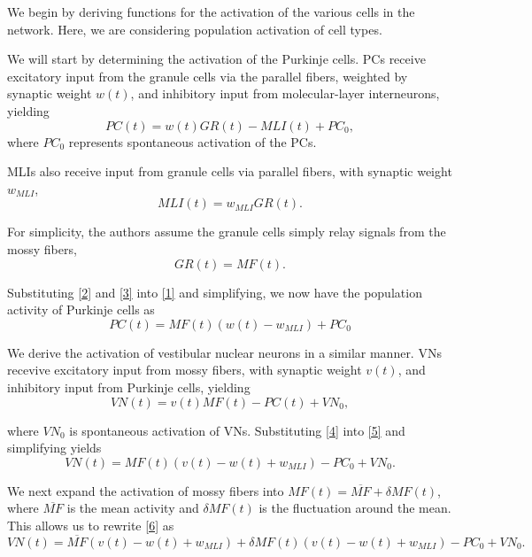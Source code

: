 \documentclass[10pt]{article}
\begin{document}
We begin by deriving functions for the activation of the various cells in the network. Here, we are considering population activation of cell types.

We will start by determining the activation of the Purkinje cells. PCs receive excitatory input from the granule cells via the parallel fibers, weighted by synaptic weight $w(t)$, and  inhibitory input from molecular-layer interneurons, yielding 
\begin{equation}
    \label{1}
    PC(t) = w(t)GR(t)-MLI(t)+PC_0,
\end{equation}
where $PC_0$ represents spontaneous activation of the PCs.

MLIs also receive input from granule cells via parallel fibers, with synaptic weight $w_{MLI}$, \begin{equation}
    \label{2}
    MLI(t) = w_{MLI}GR(t).
\end{equation}

For simplicity, the authors assume the granule cells simply relay signals from the mossy fibers, \begin{equation}
    \label{3}
    GR(t) = MF(t).
\end{equation}

Substituting \eqref{2} and \eqref{3} into \eqref{1} and simplifying, we now have the population activity of Purkinje cells as \begin{equation}
    \label{4}
    PC(t) = MF(t)(w(t)-w_{MLI}) + PC_0
\end{equation}

We derive the activation of vestibular nuclear neurons in a similar manner. VNs recevive excitatory input from mossy fibers, with synaptic weight $v(t)$, and inhibitory input from Purkinje cells, yielding 
\begin{equation}
    \label{5}
    VN(t) = v(t)MF(t) - PC(t) + VN_0,
\end{equation}

where $VN_0$ is spontaneous activation of VNs. Substituting \eqref{4} into \eqref{5} and simplifying yields \begin{equation}
    \label{6}
    VN(t) = MF(t)(v(t)-w(t)+w_{MLI}) - PC_0 + VN_0.
\end{equation}

We next expand the activation of mossy fibers into \(MF(t) = \overline{MF} + \delta MF(t)\), where \(\overline{MF}\) is the mean activity and \(\delta MF(t)\) is the fluctuation around the mean. This allows us to rewrite \eqref{6} as \begin{equation}
    \label{7}
    VN(t) = \overline{MF}(v(t)-w(t)+w_{MLI}) + \delta MF(t)(v(t)-w(t)+w_{MLI}) - PC_0 + VN_0.
\end{equation}
\end{document}
